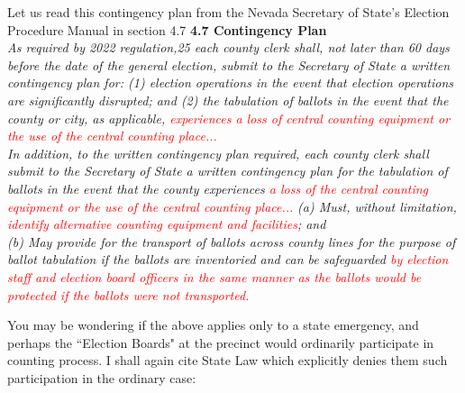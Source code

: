 \documentclass[preprint,13pt]{elsarticle}
\begin{document}
Let us read this contingency plan from the Nevada Secretary of State's Election Procedure Manual in section 4.7
\newpage
\textbf{4.7 Contingency Plan}\\
\textit{As required by 2022 regulation,25 each county clerk shall, not later than 60 days before the date of the general
election, submit to the Secretary of State a written contingency plan for: (1) election operations in the event
that election operations are significantly disrupted; and (2) the tabulation of ballots in the event that the
county or city, as applicable, \textcolor{red}{experiences a loss of central counting equipment or the use of the central
counting place...} }\\
\textit{In addition, to the written contingency plan required, each county clerk shall submit to the Secretary of State a written contingency plan for the tabulation of ballots in the event that the county experiences \textcolor{red}{a loss of the central counting equipment or the use of the central counting place...}}
\textit{(a) Must, without limitation, \textcolor{red}{identify alternative counting equipment and facilities}; and\\
(b) May provide for the transport of ballots across county lines for the purpose of ballot tabulation if the
ballots are inventoried and can be safeguarded \textcolor{red}{by election staff and election board officers in the same manner as the ballots would be protected if the ballots were not transported.}}

You may be wondering if the above applies only to a state emergency, and perhaps the ``Election Boards" at the precinct would ordinarily participate in counting process. I shall again cite State Law which explicitly denies them such participation in the ordinary case:
\end{document}
